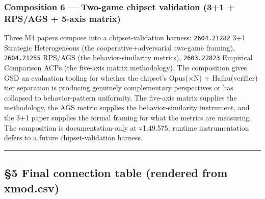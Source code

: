 \documentclass[11pt,letterpaper]{article}
\newcommand{\arxivid}[1]{\texttt{\textcolor{accent}{#1}}}
\begin{document}
\subsubsection{Composition 6 --- Two-game chipset validation (3+1 +
RPS/AGS + 5-axis
matrix)}

Three M4 papers compose into a chipset-validation harness:
\arxivid{2604.21282} 3+1 Strategic Heterogeneous (the
cooperative+adversarial two-game framing), \arxivid{2604.21255} RPS/AGS
(the behavior-similarity metrics), \arxivid{2603.22823} Empirical
Comparison ACPs (the five-axis matrix methodology). The composition
gives GSD an evaluation tooling for whether the chipset's Opus(×N) +
Haiku(verifier) tier separation is producing genuinely complementary
perspectives or has collapsed to behavior-pattern uniformity. The
five-axis matrix supplies the methodology, the AGS metric supplies the
behavior-similarity instrument, and the 3+1 paper supplies the formal
framing for what the metrics are measuring. The composition is
documentation-only at v1.49.575; runtime instrumentation defers to a
future chipset-validation harness.

\begin{center}\rule{0.5\linewidth}{0.5pt}\end{center}

\subsection{§5 Final connection table (rendered from
xmod.csv)}
\end{document}
